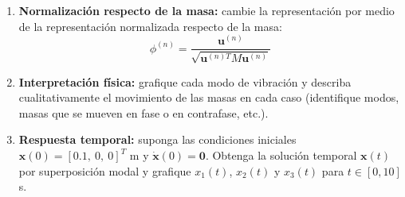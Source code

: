 \documentclass[11pt]{article}
\begin{document}
\begin{question}
\begin{enumerate}
    \item \textbf{Normalización respecto de la masa:} cambie la representación por medio de la representación normalizada respecto de la masa:
      \[ \phi^{(n)} = \frac{\mathbf{u}^{(n)}}{\sqrt{\mathbf{u}^{(n)T} M \mathbf{u}^{(n)}}} \]

		\item \textbf{Interpretación física:} grafique cada modo de vibración y describa
		      cualitativamente el movimiento de las masas en cada caso (identifique modos, masas
		      que se mueven en fase o en contrafase, etc.).

		\item \textbf{Respuesta temporal:} suponga las condiciones iniciales
		      $\mathbf{x}(0) = [0.1,\ 0,\ 0]^T$ m y $\dot{\mathbf{x}}(0) = \mathbf{0}$.
		      Obtenga la solución temporal $\mathbf{x}(t)$ por superposición modal y grafique
		      $x_1(t)$, $x_2(t)$ y $x_3(t)$ para $t \in [0, 10]$ s.
	\end{enumerate}

\end{question}
\end{document}

